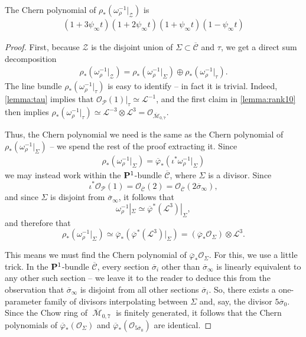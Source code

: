 \documentclass[12pt,reqno]{amsart}
\DeclareMathOperator{\M}{\mathcal{M}}
\numberwithin{equation}{section}
\renewcommand{\O}{\mathcal O}
\newcommand{\cP}{\mathcal P}
\newcommand{\cC}{\mathcal{C}}
\renewcommand {\o}[1]{\overline{#1}}
\begin{document}
\begin{proposition}
  \label{prop:omegarestrictZ} The Chern polynomial of $\rho_{*}(\omega_{\rho}^{-1}|_{\mathcal{Z}})$ is
  \begin{align}
    \label{eq:rank6}
    (1+3\psi_{\infty}t) (1+2\psi_{\infty}t) (1+\psi_{\infty}t)  (1-\psi_{\infty}t)
  \end{align}
\end{proposition}

\begin{proof}
  First, because $\mathcal{Z}$ is the disjoint union of
  $\Sigma \subset \o{\mathcal{C}}$ and $\tau$, we get a direct sum
  decomposition
  \begin{align}
    \label{eq:dirsum}
    \rho_{*}(\omega_{\rho}^{-1}|_{\mathcal{Z}}) = \rho_{*}(\omega_{\rho}^{-1}|_{\Sigma}) \oplus \rho_{*}(\omega_{\rho}^{-1}|_{\tau}).
  \end{align}
  The line bundle $\rho_{*}(\omega_{\rho}^{-1}|_{\tau})$ is easy to
  identify -- in fact it is trivial.  Indeed, \autoref{lemma:tau}
  implies that $\O_{\cP}(1)|_{\tau} \simeq \mathcal{L}^{-1}$, and the
  first claim in \autoref{lemma:rank10} then implies
  $\rho_{*}(\omega_{\rho}^{-1}|_{\tau}) \simeq \mathcal{L}^{-3}
  \otimes \mathcal{L}^{3} = \O_{\o{\M}_{0,7}}$.

  Thus, the Chern polynomial we need is the same as the Chern
  polynomial of $\rho_{*}(\omega_{\rho}^{-1}|_{\Sigma})$ -- we spend
  the rest of the proof extracting it.  Since
  \begin{align*}
    \rho_{*}(\omega_{\rho}^{-1}|_{\Sigma}) = \o{\varphi}_{*}(\iota^{*}\omega_{\rho}^{-1}|_{\Sigma})
  \end{align*}
  we may instead work within the $\P^{1}$-bundle $\o{\cC}$, where
  $\Sigma$ is a divisor.  Since
  $$\iota^{*}\O_{\cP}(1) = \O_{\o{\cC}}(2) = \O_{\o{\cC}}(2\o{\sigma}_{\infty}),$$
  and since $\Sigma$ is disjoint from $\o{\sigma}_{\infty}$, it follows that
  $$\omega_{\rho}^{-1}|_{\Sigma} \simeq \o{\varphi}^{*}(\mathcal{L}^{3})|_{\Sigma},$$ and therefore that
  $$\rho_{*}(\omega_{\rho}^{-1}|_{\Sigma}) \simeq \o{\varphi}_{*}(\o{\varphi}^{*}(\mathcal{L}^{3})|_{\Sigma}) = (\o{\varphi}_{*}\O_{\Sigma})\otimes \mathcal{L}^{3}.$$

  This means we must find the Chern polynomial of
  $\o{\varphi}_{*}\O_{\Sigma}$.  For this, we use a little trick.  In
  the $\P^{1}$-bundle $\o{\cC}$, every section $\o{\sigma}_{i}$ other
  than $\o{\sigma}_{\infty}$ is linearly equivalent to any other such
  section -- we leave it to the reader to deduce this from the
  observation that $\o{\sigma}_{\infty}$ is disjoint from all other
  sections $\o{\sigma}_{i}$.  So, there exists a one-parameter family
  of divisors interpolating between $\Sigma$ and, say, the divisor
  $5\o{\sigma}_{0}$.  Since the Chow ring of $\o{\M}_{0,7}$ is
  finitely generated, it follows that the Chern polynomials of
  $\o{\varphi}_{*}(\O_{\Sigma})$ and
  $\o{\varphi}_{*}(\O_{5 \o{\sigma}_{0}})$ are identical.


\end{proof}
\end{document}
